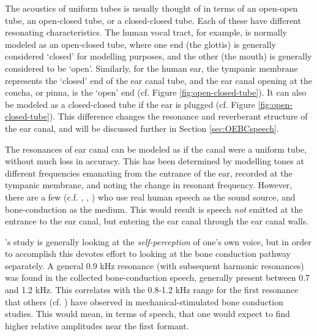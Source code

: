 The acoustics of uniform tubes is usually thought of in terms of an open-open tube, an open-closed tube, or a closed-closed tube.  Each of these have different resonating characteristics. The human vocal tract, for example, is normally modeled as an open-closed tube, where one end (the glottis) is generally considered `closed' for modelling purposes, and the other (the mouth) is generally considered to be `open'.  Similarly, for the human ear, the tympanic membrane represents the `closed' end of the ear canal tube, and the ear canal opening at the concha, or pinna, is the `open' end (cf. Figure \ref{fig:open-closed-tube}).  It can also be modeled as a closed-closed tube if the ear is plugged (cf. Figure \ref{fig:open-closed-tube}). This difference changes the resonance and reverberant structure of the ear canal, and will be discussed further in Section \ref{sec:OEBCspeech}.  


The resonances of ear canal can be modeled as if the canal were a uniform tube, without much loss in accuracy.  This has been determined by modelling tones at different frequencies emanating from the entrance of the ear, recorded at the tympanic membrane, and noting the change in resonant frequency. However, there are a few (c.f. \cite{bekesy:48}, \cite{porschmann:00}, \cite{reinfeldt:10}) who use real human speech as the sound source, and bone-conduction as the medium.  This would result is speech \textit{not} emitted at the entrance to the ear canal, but entering the ear canal through the ear canal walls.
%

\cite{porschmann:00}'s study is generally looking at the \textit{self-perception} of one's own voice, but in order to accomplish this devotes effort to looking at the bone conduction pathway separately.  A general 0.9 kHz resonance (with subsequent harmonic resonances) was found in the collected bone-conduction speech, generally present between 0.7 and 1.2 kHz.  This correlates with the 0.8-1.2 kHz range for the first resonance that others (cf. \cite{hakansson:94}) have observed in mechanical-stimulated bone conduction studies. This would mean, in terms of speech, that one would expect to find higher relative amplitudes near the first formant.

